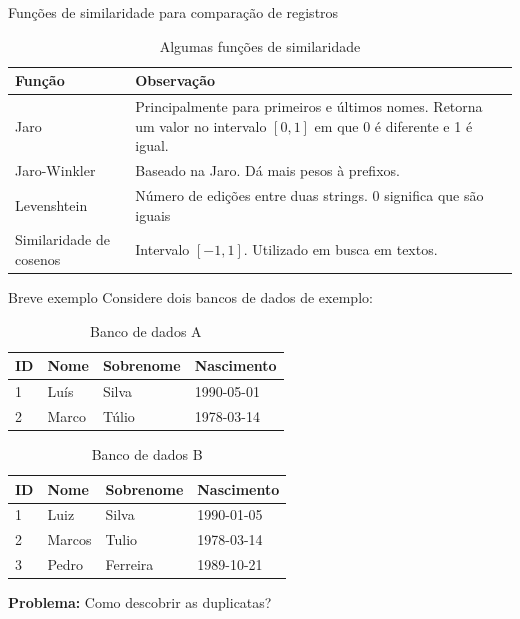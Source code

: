 \documentclass{beamer}
\newcommand\Fontvi{\fontsize{7}{7.2}\selectfont}
\begin{document}
  \begin{frame}{Funções de similaridade para comparação de registros}
      \begin{table}
          \centering
          \caption{Algumas funções de similaridade \cite{survey}}
          \begin{tabularx}{\textwidth}{|l|X|}
              \hline
              Função                    & Observação \\ \hline
              Jaro                      & Principalmente para primeiros e últimos nomes. Retorna um valor no intervalo $[0,1]$ em que 0 é diferente e 1 é igual. \cite{jaro}\\ \hline
              Jaro-Winkler              & Baseado na Jaro. Dá mais pesos à prefixos. \cite{jaro-winkler} \\ \hline
              Levenshtein               & Número de edições entre duas strings. 0 significa que são iguais\\ \hline
              Similaridade de cosenos   & Intervalo $[-1, 1]$. Utilizado em busca em textos. \\ \hline
          \end{tabularx}
      \end{table}
  \end{frame}

  \begin{frame}{Breve exemplo}
      Considere dois bancos de dados de exemplo:
      \Fontvi
      \begin{multicols}{2}
          \begin{table}[]
              \centering
              \caption{Banco de dados A}
              \begin{tabular}{|l|l|l|l|}
                  \hline
                  ID & Nome  & Sobrenome & Nascimento \\ \hline
                  1  & Luís  & Silva     & 1990-05-01 \\
                  2  & Marco & Túlio     & 1978-03-14 \\ \hline
              \end{tabular}
          \end{table}
          \columnbreak
          \begin{table}[]
              \centering
              \caption{Banco de dados B}
              \begin{tabular}{|l|l|l|l|}
                  \hline
                  ID & Nome   & Sobrenome & Nascimento \\ \hline
                  1  & Luiz   & Silva     & 1990-01-05 \\
                  2  & Marcos & Tulio     & 1978-03-14 \\
                  3  & Pedro  & Ferreira  & 1989-10-21 \\ \hline
              \end{tabular}
          \end{table}
      \end{multicols}

      \textbf{Problema:} Como descobrir as duplicatas?
  \end{frame}
\end{document}

